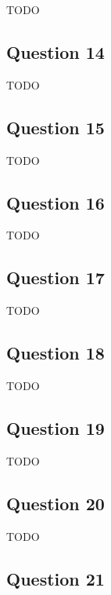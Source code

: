 \documentclass[12pt, letterpaper, oneside]{book}
\begin{document}
TODO

\subsection{Question 14}

TODO

\subsection{Question 15}

TODO

\subsection{Question 16}

TODO

\subsection{Question 17}

TODO

\subsection{Question 18}

TODO

\subsection{Question 19}

TODO

\subsection{Question 20}

TODO

\subsection{Question 21}
\end{document}
